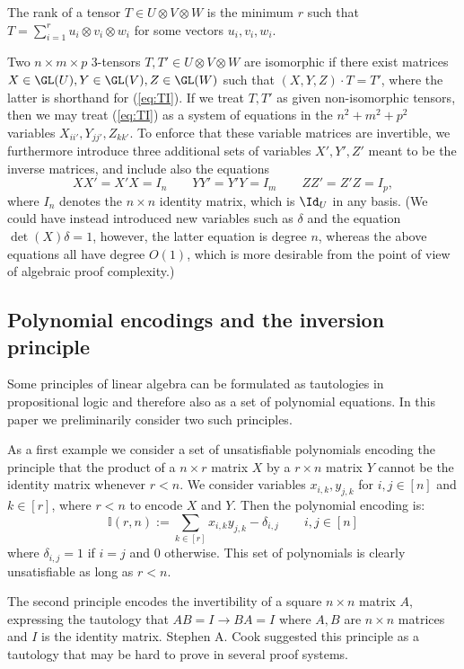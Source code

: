 The rank of a tensor $T \in U \otimes V \otimes W$ is the minimum $r$ such that $T = \sum_{i=1}^r u_i \otimes v_i \otimes w_i$ for some vectors $u_i, v_i, w_i$. 

Two $n \times m \times p$ 3-tensors $T,T' \in U \otimes V \otimes W$ are isomorphic if there exist matrices $X \in \GL(U), Y \in \GL(V), Z \in \GL(W)$ such that $(X,Y,Z) \cdot T = T'$, where the latter is shorthand for (\ref{eq:TI}).
If we treat $T,T'$ as given non-isomorphic tensors, then we may treat (\ref{eq:TI}) as a system of equations in the $n^2 + m^2 + p^2$ variables $X_{ii'}, Y_{jj'}, Z_{kk'}$. To enforce that these variable matrices are invertible, we furthermore introduce three additional sets of variables $X', Y', Z'$ meant to be the inverse matrices, and include also the equations 
\[
XX' = X'X = I_n \qquad YY' = Y'Y = I_m \qquad ZZ' = Z' Z = I_p,
\]
where $I_n$ denotes the $n \times n$ identity matrix, which is $\Id_U$ in any basis. (We could have instead introduced new variables such as $\delta$ and the equation $\det(X) \delta = 1$, however, the latter equation is degree $n$, whereas the above equations all have degree $O(1)$, which is more desirable from the point of view of algebraic proof complexity.)

\subsection{Polynomial encodings and the inversion principle} \label{sec:prelim:inv}
Some  principles of linear algebra can be formulated as tautologies in propositional logic and therefore also as a set of polynomial equations.
In this paper we preliminarily consider two such principles. 

\medskip

 As a first example we consider a set of unsatisfiable polynomials encoding the principle that  the product of a $n\times r$ matrix $X$ by a $r\times n$ matrix $Y$ cannot be the identity matrix whenever $r<n$.  We consider variables $x_{i,k},y_{j,k}$ for $i,j\in [n]$ and $k\in [r]$, where $r< n$ to encode $X$ and $Y$. Then the polynomial encoding is:
$$\mathbb I(r,n) := \sum_{k\in[r]} x_{i,k}y_{j,k}-\delta_{i,j} \quad \quad i,j\in [n]$$
where $\delta_{i,j}=1$ if $i=j$ and $0$ otherwise. This set of polynomials is clearly unsatisfiable as long as $r<n$. 

\medskip

 The second principle encodes the invertibility of a square $n\times n$ matrix $A$,  expressing the tautology that
 $AB=I \rightarrow BA=I$ where $A,B$ are $n\times n$ matrices and $I$ is the identity matrix. Stephen A. Cook suggested this principle as a tautology that may be hard to prove in several proof systems. 
 
